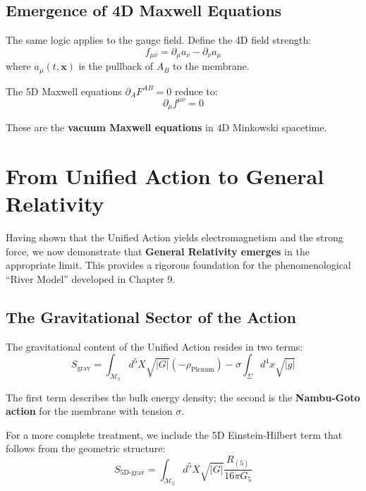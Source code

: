 \subsection{Emergence of 4D Maxwell Equations}

The same logic applies to the gauge field. Define the 4D field strength:
\begin{equation}
f_{\mu\nu} = \partial_\mu a_\nu - \partial_\nu a_\mu
\end{equation}
where $a_\mu(t,\mathbf{x})$ is the pullback of $A_B$ to the membrane.

The 5D Maxwell equations $\partial_A F^{AB} = 0$ reduce to:
\begin{equation}
\boxed{\partial_\mu f^{\mu\nu} = 0}
\end{equation}

These are the \textbf{vacuum Maxwell equations} in 4D Minkowski spacetime.

\newpage

\section{From Unified Action to General Relativity}
\label{sec:unified_to_gr}

Having shown that the Unified Action yields electromagnetism and the strong force, we now demonstrate that \textbf{General Relativity emerges} in the appropriate limit. This provides a rigorous foundation for the phenomenological ``River Model'' developed in Chapter 9.

\subsection{The Gravitational Sector of the Action}

The gravitational content of the Unified Action resides in two terms:
\begin{equation}
S_{\text{grav}} = \int_{\mathcal{M}_5} d^5X \sqrt{|G|} \left( -\rho_{\text{Plenum}} \right) - \sigma \int_\Sigma d^4x \sqrt{|g|}
\end{equation}

The first term describes the bulk energy density; the second is the \textbf{Nambu-Goto action} for the membrane with tension $\sigma$.

For a more complete treatment, we include the 5D Einstein-Hilbert term that follows from the geometric structure:
\begin{equation}
S_{\text{5D-grav}} = \int_{\mathcal{M}_5} d^5X \sqrt{|G|} \frac{R_{(5)}}{16\pi G_5}
\end{equation}


